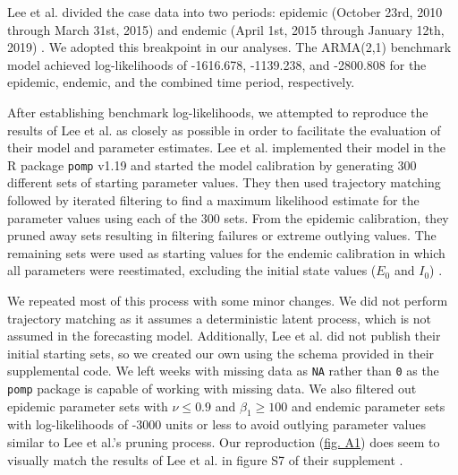 \documentclass[12pt]{article}
\begin{document}
  Lee et al. divided the case data into two periods: epidemic (October 23rd, 2010 through March 31st, 2015) and endemic (April 1st, 2015 through January 12th, 2019) \cite{Lee_supp}. We adopted this breakpoint in our analyses. The ARMA(2,1) benchmark model achieved log-likelihoods of -1616.678, -1139.238, and -2800.808 for the epidemic, endemic, and the combined time period, respectively.
  
 After establishing benchmark log-likelihoods, we attempted to reproduce the results of Lee et al. as closely as possible in order to facilitate the evaluation of their model and parameter estimates. Lee et al. implemented their model in the R package \texttt{pomp} v1.19 and started the model calibration by generating 300 different sets of starting parameter values. They then used trajectory matching followed by iterated filtering to find a maximum likelihood estimate for the parameter values using each of the 300 sets. From the epidemic calibration, they pruned away sets resulting in filtering failures or extreme outlying values. The remaining sets were used as starting values for the endemic calibration in which all parameters were reestimated, excluding the initial state values ($E_0$ and $I_0$) \cite{Lee_supp}.

  We repeated most of this process with some minor changes. We did not perform trajectory matching as it assumes a deterministic latent process, which is not assumed in the forecasting model. Additionally, Lee et al. did not publish their initial starting sets, so we created our own using the schema provided in their supplemental code. We left weeks with missing data as \texttt{NA} rather than \texttt{0} as the \texttt{pomp} package is capable of working with missing data. We also filtered out epidemic parameter sets with $\nu \leq 0.9$ and $\beta_1 \geq 100$ and endemic parameter sets with log-likelihoods of -3000 units or less to avoid outlying parameter values similar to Lee et al.'s pruning process. Our reproduction (\hyperref[fig:A1]{fig. A1}) does seem to visually match the results of Lee et al. in figure S7 of their supplement \cite{Lee_supp}. 


\newpage


\end{document}
